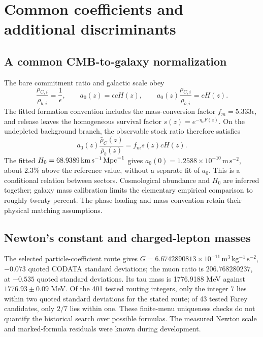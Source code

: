 \section{Common coefficients and additional discriminants}
\label{sec:discriminants}

\subsection{A common CMB-to-galaxy normalization}
\label{sec:crossnorm}
The bare commitment ratio and galactic scale obey
\begin{equation}
\frac{\rho_{C,i}}{\rho_{b,i}}=\frac1\epsilon,\qquad
a_0(z)=\epsilon cH(z),\qquad
a_0(z)\frac{\rho_{C,i}}{\rho_{b,i}}=cH(z).
\end{equation}
The fitted formation convention includes the mass-conversion factor
$f_m=5.333\epsilon$, and release leaves the homogeneous survival factor
$s(z)=e^{-\eta_*F(z)}$. On the undepleted background branch, the
observable stock ratio therefore satisfies
\begin{equation}
a_0(z)\frac{\bar\rho_C(z)}{\bar\rho_b(z)}=f_m s(z)cH(z).
\label{eq:crossnorm}
\end{equation}
The fitted $H_0=68.9389\,\mathrm{km\,s^{-1}}\,\mathrm{Mpc}^{-1}$ gives
$a_0(0)=1.2588\times10^{-10}\,\mathrm{m\,s^{-2}}$, about 2.3\%
above the reference value, without a separate fit of $a_0$.
This is a conditional relation between sectors. Cosmological abundance
and $H_0$ are inferred together; galaxy mass calibration limits the
elementary empirical comparison to roughly twenty percent. The phase
loading and mass convention retain their physical matching assumptions.

\subsection{Newton's constant and charged-lepton masses}
\label{sec:constants}
The selected particle-coefficient route gives
$G=6.6742890813\times10^{-11}\,\mathrm{m^3\,kg^{-1}\,s^{-2}}$,
$-0.073$ quoted CODATA standard deviations; the muon ratio is
$206.768280237$, at $-0.535$ quoted standard deviations. Its tau mass
is 1776.9188 MeV against $1776.93\pm0.09$ MeV. Of the 401 tested
routing integers, only the integer $7$ lies within two quoted standard deviations
for the stated route; of 43 tested Farey candidates, only $2/7$ lies
within one. These finite-menu uniqueness checks do not quantify the
historical search over possible formulas. The measured Newton scale
and marked-formula residuals were known during development.
\cite{constantsnew}


